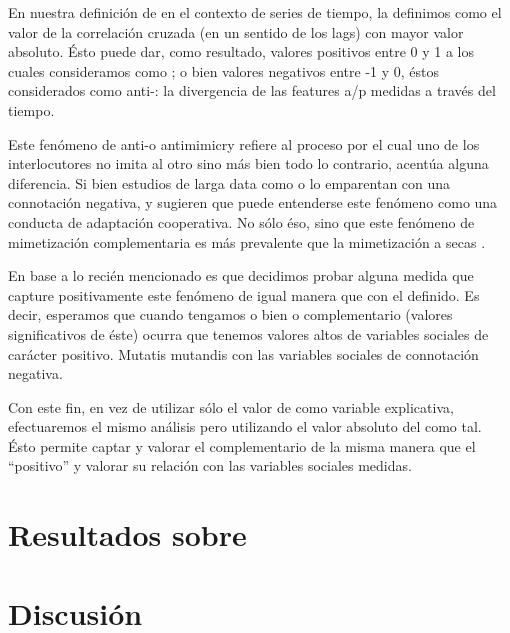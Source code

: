 En nuestra definición de \entrainment en el contexto de series de tiempo, la definimos como el valor de la correlación cruzada (en un sentido de los lags) con mayor valor absoluto. Ésto puede dar, como resultado, valores positivos entre 0 y 1 a los cuales consideramos como \entrainment; o bien valores negativos entre -1 y 0, éstos considerados como anti-\entrainment: la divergencia de las features a/p medidas a través del tiempo.

Este fenómeno de anti-\entrainment o antimimicry \cite{CHAR1999} refiere al proceso por el cual uno de los interlocutores no imita al otro sino más bien todo lo contrario, acentúa alguna diferencia. Si bien estudios de larga data como \cite{bourhis1973language} o \cite{dabbs1969similarity} lo emparentan con una connotación negativa, \cite{healey2014divergence} y \cite{levitan2015acoustic} sugieren que puede entenderse este fenómeno como una conducta de adaptación cooperativa. No sólo éso, sino que este fenómeno de mimetización complementaria es más prevalente que la mimetización a secas \cite{levitan2015acoustic}.

En base a lo recién mencionado es que decidimos probar alguna medida que capture positivamente este fenómeno de igual manera que con el \entrainment definido. Es decir, esperamos que cuando tengamos o bien \entrainment o \entrainment complementario (valores significativos de éste) ocurra que tenemos valores altos de variables sociales de carácter positivo. Mutatis mutandis con las variables sociales de connotación negativa.

Con este fin, en vez de utilizar sólo el valor de \entrainment como variable explicativa, efectuaremos el mismo análisis pero utilizando el valor absoluto del \entrainment como tal. Ésto permite captar y valorar el \entrainment complementario de la misma manera que el ``positivo'' y valorar su relación con las variables sociales medidas.

\section{Resultados sobre \absentrainment}


\section{Discusión}

